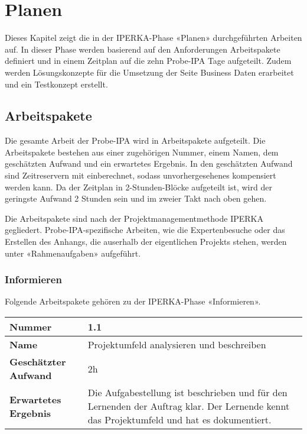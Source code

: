 \chapter{Planen}\label{ch:planen}
Dieses Kapitel zeigt die in der IPERKA-Phase «Planen» durchgeführten Arbeiten auf. In dieser Phase werden basierend auf den Anforderungen Arbeitspakete definiert und in einem Zeitplan auf die zehn Probe-IPA Tage aufgeteilt. Zudem werden Lösungskonzepte für die Umsetzung der Seite Business Daten erarbeitet und ein Testkonzept erstellt.

\section{Arbeitspakete}
Die gesamte Arbeit der Probe-IPA wird in Arbeitspakete aufgeteilt. Die Arbeitspakete bestehen aus einer zugehörigen Nummer, einem Namen, dem geschätzten Aufwand und ein erwartetes Ergebnis. In den geschätzten Aufwand sind Zeitreservern mit einberechnet, sodass unvorhergesehenes kompensiert werden kann. Da der Zeitplan in 2-Stunden-Blöcke aufgeteilt ist, wird der geringste Aufwand 2 Stunden sein und im zweier Takt nach oben gehen.

Die Arbeitspakete sind nach der Projektmanagementmethode IPERKA gegliedert. Probe-IPA-spezifische Arbeiten, wie die Expertenbesuche oder das Erstellen des Anhangs, die auserhalb der eigentlichen Projekts stehen, werden unter «Rahmenaufgaben» aufgeführt.

\subsection{Informieren}
Folgende Arbeitspakete gehören zu der IPERKA-Phase «Informieren».

\begin{longtable}{p{}|p{}}
	\hline
	\textbf{Nummer}                 & \textbf{1.1}            \\
	\hline
	\textbf{Name}   				& Projektumfeld analysieren und beschreiben                  \\
	\hline
	\textbf{Geschätzter Aufwand}    & 2h                                    \\
	\hline
	\textbf{Erwartetes Ergebnis}    & Die Aufgabestellung ist beschrieben und für den Lernenden der Auftrag klar. Der Lernende kennt das Projektumfeld und hat es dokumentiert.                                    \\
	\hline
\end{longtable}\label{tab:informieren-1.1}

